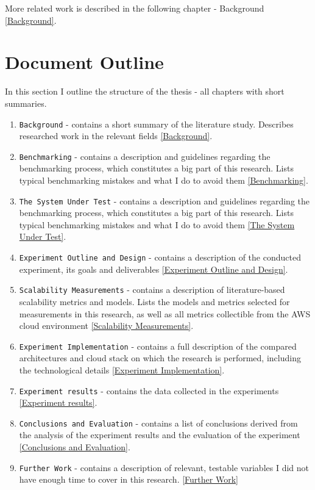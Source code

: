\documentclass{uvamscse}
\begin{document}
More related work is described in the following chapter - Background \ref{Background}.

\section{Document Outline}
In this section I outline the structure of the thesis - all chapters with short summaries.

\begin{enumerate}
  \item \texttt{Background} - contains a short summary of the literature study. Describes researched work in the relevant fields \ref{Background}.
  \item \texttt{Benchmarking} - contains a description and guidelines regarding the benchmarking process, which constitutes a big part of this research. Lists typical benchmarking mistakes and what I do to avoid them \ref{Benchmarking}.
  \item \texttt{The System Under Test} - contains a description and guidelines regarding the benchmarking process, which constitutes a big part of this research. Lists typical benchmarking mistakes and what I do to avoid them \ref{The System Under Test}.
  \item \texttt{Experiment Outline and Design} - contains a description of the conducted experiment, its goals and deliverables \ref{Experiment Outline and Design}.
  \item \texttt{Scalability Measurements} - contains a description of literature-based scalability metrics and models. Lists the models and metrics selected for measurements in this research, as well as all metrics collectible from the AWS cloud environment \ref{Scalability Measurements}.
  \item \texttt{Experiment Implementation} - contains a full description of the compared architectures and cloud stack on which the research is performed, including the technological details \ref{Experiment Implementation}.
  \item \texttt{Experiment results} - contains the data collected in the experiments \ref{Experiment results}.
  \item \texttt{Conclusions and Evaluation} - contains a list of conclusions derived from the analysis of the experiment results and the evaluation of the experiment \ref{Conclusions and Evaluation}.
  \item \texttt{Further Work} - contains a description of relevant, testable variables I did not have enough time to cover in this research. \ref{Further Work}
\end{enumerate}
\end{document}
